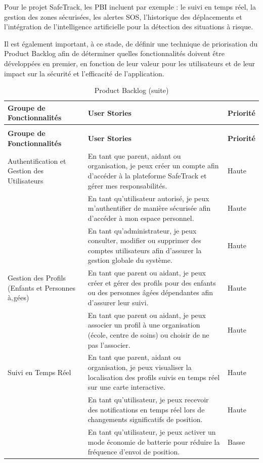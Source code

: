 Pour le projet SafeTrack, les PBI incluent par exemple : le suivi en temps réel, la gestion des zones sécurisées, les alertes SOS, l'historique des déplacements et l'intégration de l'intelligence artificielle pour la détection des situations à risque.

Il est également important, à ce stade, de définir une technique de priorisation du Product Backlog afin de déterminer quelles fonctionnalités doivent être développées en premier, en fonction de leur valeur pour les utilisateurs et de leur impact sur la sécurité et l'efficacité de l'application.
\small
\renewcommand{\arraystretch}{1.2}
\begin{longtable}{|>{\raggedright\arraybackslash}p{}|>{\raggedright\arraybackslash}p{}|>{\centering\arraybackslash}p{}|}
\caption{Product Backlog} \label{tab:product_backlog} \\
\hline
\textbf{Groupe de Fonctionnalités} & \textbf{User Stories} & \textbf{Priorité}  \\
\hline
\endfirsthead
\caption[]{Product Backlog (suite)} \\
\hline
\textbf{Groupe de Fonctionnalités} & \textbf{User Stories} & \textbf{Priorité}  \\
\hline
\endhead
\hline
\endfoot
\hline
\endlastfoot
\hline

Authentification et Gestion des Utilisateurs 
& En tant que parent, aidant ou organisation, je peux créer un compte afin d'accéder à la plateforme SafeTrack et gérer mes responsabilités. 
& Haute \\
\cline{2-3}
& En tant qu'utilisateur autorisé, je peux m'authentifier de manière sécurisée afin d'accéder à mon espace personnel. 
& Haute \\
\cline{2-3}
& En tant qu'administrateur, je peux consulter, modifier ou supprimer des comptes utilisateurs afin d'assurer la gestion globale du système. 
& Haute \\
\hline

Gestion des Profils (Enfants et Personnes à‚gées) 
& En tant que parent ou aidant, je peux créer et gérer des profils pour des enfants ou des personnes âgées dépendantes afin d'assurer leur suivi. 
& Haute \\
\cline{2-3}
& En tant que parent ou aidant, je peux associer un profil à une organisation (école, centre de soins) ou choisir de ne pas l'associer. 
& Haute \\
\hline

Suivi en Temps Réel 
& En tant que parent, aidant ou organisation, je peux visualiser la localisation des profils suivis en temps réel sur une carte interactive. 
& Haute \\
\cline{2-3}
& En tant qu'utilisateur, je peux recevoir des notifications en temps réel lors de changements significatifs de position. 
& Haute \\
\cline{2-3}
& En tant qu'utilisateur, je peux activer un mode économie de batterie pour réduire la fréquence d'envoi de position. 
& Basse \\
\hline


\end{longtable}
